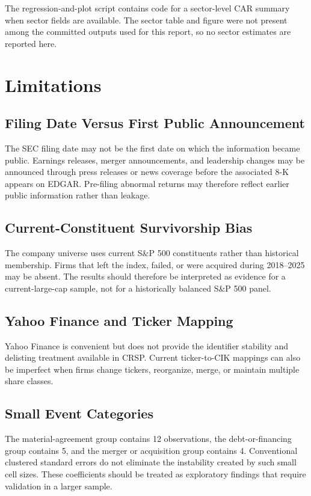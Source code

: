\documentclass[12pt]{article}
\begin{document}
The regression-and-plot script contains code for a sector-level CAR summary when sector fields are available. The sector table and figure were not present among the committed outputs used for this report, so no sector estimates are reported here.

\section{Limitations}

\subsection{Filing Date Versus First Public Announcement}

The SEC filing date may not be the first date on which the information became public. Earnings releases, merger announcements, and leadership changes may be announced through press releases or news coverage before the associated 8-K appears on EDGAR. Pre-filing abnormal returns may therefore reflect earlier public information rather than leakage.

\subsection{Current-Constituent Survivorship Bias}

The company universe uses current S\&P 500 constituents rather than historical membership. Firms that left the index, failed, or were acquired during 2018--2025 may be absent. The results should therefore be interpreted as evidence for a current-large-cap sample, not for a historically balanced S\&P 500 panel.

\subsection{Yahoo Finance and Ticker Mapping}

Yahoo Finance is convenient but does not provide the identifier stability and delisting treatment available in CRSP. Current ticker-to-CIK mappings can also be imperfect when firms change tickers, reorganize, merge, or maintain multiple share classes.

\subsection{Small Event Categories}

The material-agreement group contains 12 observations, the debt-or-financing group contains 5, and the merger or acquisition group contains 4. Conventional clustered standard errors do not eliminate the instability created by such small cell sizes. These coefficients should be treated as exploratory findings that require validation in a larger sample.
\end{document}
